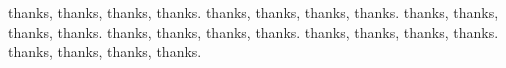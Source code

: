 \documentclass{sigplanconf}
\begin{document}
\appendix
% 

\acks
thanks, thanks, thanks, thanks. thanks, thanks, thanks, thanks.
thanks, thanks, thanks, thanks. thanks, thanks, thanks, thanks.
thanks, thanks, thanks, thanks. thanks, thanks, thanks, thanks.






\softraggedright

\end{document}
